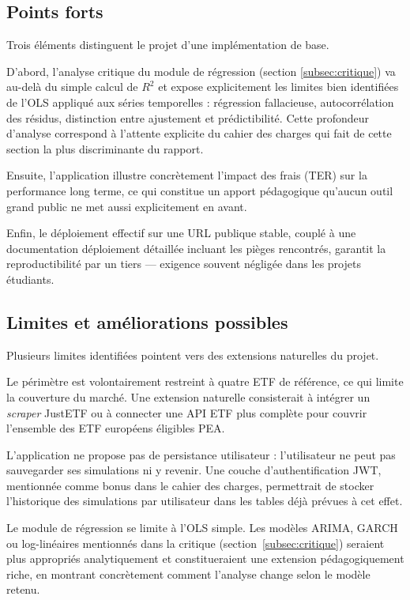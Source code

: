 \documentclass[11pt,a4paper]{article}
\begin{document}
\subsection{Points forts}

Trois éléments distinguent le projet d'une implémentation de base.

D'abord, l'analyse critique du module de régression (section
\ref{subsec:critique}) va au-delà du simple calcul de $R^2$ et expose
explicitement les limites bien identifiées de l'OLS appliqué aux
séries temporelles : régression fallacieuse, autocorrélation des
résidus, distinction entre ajustement et prédictibilité. Cette
profondeur d'analyse correspond à l'attente explicite du cahier des
charges qui fait de cette section la plus discriminante du rapport.

Ensuite, l'application illustre concrètement l'impact des frais (TER)
sur la performance long terme, ce qui constitue un apport pédagogique
qu'aucun outil grand public ne met aussi explicitement en avant.

Enfin, le déploiement effectif sur une URL publique stable, couplé
à une documentation déploiement détaillée incluant les pièges
rencontrés, garantit la reproductibilité par un tiers — exigence
souvent négligée dans les projets étudiants.

\subsection{Limites et améliorations possibles}

Plusieurs limites identifiées pointent vers des extensions naturelles
du projet.

Le périmètre est volontairement restreint à quatre ETF de référence,
ce qui limite la couverture du marché. Une extension naturelle
consisterait à intégrer un \textit{scraper} JustETF ou à connecter
une API ETF plus complète pour couvrir l'ensemble des ETF européens
éligibles PEA.

L'application ne propose pas de persistance utilisateur :
l'utilisateur ne peut pas sauvegarder ses simulations ni y revenir.
Une couche d'authentification JWT, mentionnée comme bonus dans le
cahier des charges, permettrait de stocker l'historique des
simulations par utilisateur dans les tables déjà prévues à cet effet.

Le module de régression se limite à l'OLS simple. Les modèles ARIMA,
GARCH ou log-linéaires mentionnés dans la critique
(section~\ref{subsec:critique}) seraient plus appropriés
analytiquement et constitueraient une extension pédagogiquement
riche, en montrant concrètement comment l'analyse change selon le
modèle retenu.
\end{document}
